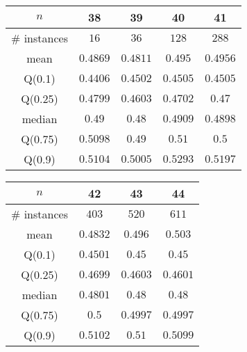 \begin{tabular}{c|cccc} 
\hline 
$n$ & 38 & 39 & 40 & 41 \tabularnewline 
\hline 
\hline 
\# instances & $16$ & $36$ & $128$ & $288$ \tabularnewline 
mean & $0.4869$ & $0.4811$ & $0.495$ & $0.4956$ \tabularnewline 
Q(0.1) & $0.4406$ & $0.4502$ & $0.4505$ & $0.4505$ \tabularnewline 
Q(0.25) & $0.4799$ & $0.4603$ & $0.4702$ & $0.47$ \tabularnewline 
median & $0.49$ & $0.48$ & $0.4909$ & $0.4898$ \tabularnewline 
Q(0.75) & $0.5098$ & $0.49$ & $0.51$ & $0.5$ \tabularnewline 
Q(0.9) & $0.5104$ & $0.5005$ & $0.5293$ & $0.5197$ \tabularnewline 
\hline 
\end{tabular} 
\medskip{} 

\begin{tabular}{c|ccc} 
\hline 
$n$ & 42 & 43 & 44 \tabularnewline 
\hline 
\hline 
\# instances & $403$ & $520$ & $611$ \tabularnewline 
mean & $0.4832$ & $0.496$ & $0.503$ \tabularnewline 
Q(0.1) & $0.4501$ & $0.45$ & $0.45$ \tabularnewline 
Q(0.25) & $0.4699$ & $0.4603$ & $0.4601$ \tabularnewline 
median & $0.4801$ & $0.48$ & $0.48$ \tabularnewline 
Q(0.75) & $0.5$ & $0.4997$ & $0.4997$ \tabularnewline 
Q(0.9) & $0.5102$ & $0.51$ & $0.5099$ \tabularnewline 
\hline 
\end{tabular} 
\medskip{} 


